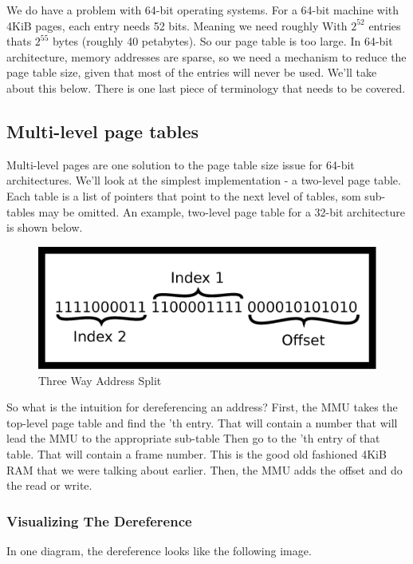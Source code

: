 We do have a problem with 64-bit operating systems.
For a 64-bit machine with 4KiB pages, each entry needs 52 bits.
Meaning we need roughly
With $2^{52}$ entries thats $2^{55}$ bytes (roughly 40 petabytes).
So our page table is too large.
In 64-bit architecture, memory addresses are sparse, so we need a mechanism to reduce the page table size, given that most of the entries will never be used.
We'll take about this below. There is one last piece of terminology that needs to be covered.

\subsection{Multi-level page tables}

Multi-level pages are one solution to the page table size issue for 64-bit architectures.
We'll look at the simplest implementation - a two-level page table.
Each table is a list of pointers that point to the next level of tables, som sub-tables may be omitted.
An example, two-level page table for a 32-bit architecture is shown below.

\begin{figure}[H]
\centering
\includegraphics[width=.5\textwidth]{ipc/drawings/three_address_split.eps}
\caption{Three Way Address Split}
\end{figure}

So what is the intuition for dereferencing an address?
First, the MMU takes the top-level page table and find the 'th entry.
That will contain a number that will lead the MMU to the appropriate sub-table
Then go to the 'th entry of that table.
That will contain a frame number.
This is the good old fashioned 4KiB RAM that we were talking about earlier.
Then, the MMU adds the offset and do the read or write.

\subsubsection{Visualizing The Dereference}

In one diagram, the dereference looks like the following image.

